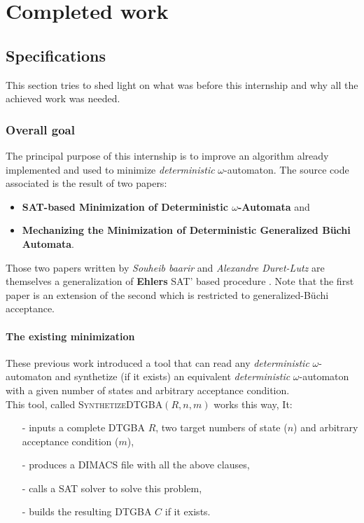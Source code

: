 \chapter{Completed work}

\section{Specifications}
This section tries to shed light on what was before this internship and why all the achieved work was
needed.

\subsection{Overall goal}
The principal purpose of this internship is to improve an algorithm already implemented and used to
minimize \textit{deterministic} $\omega$-automaton. The source code associated is the result of two papers:
\begin{itemize}
 \item \textbf{SAT-based Minimization of Deterministic $\omega$-Automata}\cite{15} and
 \item \textbf{Mechanizing the Minimization of Deterministic Generalized Büchi Automata}\cite{14}.
\end{itemize}

Those two papers written by \textit{Souheib baarir} and \textit{Alexandre Duret-Lutz} are themselves a
generalization of \textbf{Ehlers} SAT' based procedure \cite{17}. Note that the first paper\cite{15} is an
extension of the second\cite{14} which is restricted to generalized-Büchi acceptance.

\subsubsection{The existing minimization}
These previous work introduced a tool that can read any \textit{deterministic} $\omega$-automaton and
synthetize (if it exists) an equivalent \textit{deterministic} $\omega$-automaton with a given number
of states and arbitrary acceptance condition.\\

\noindent This tool, called \textsc{Synthetize}DTGBA$(R,n,m)$ works this way, It:
\begin{itemize}
 \item[-] inputs a complete DTGBA $R$, two target numbers of state ($n$) and arbitrary acceptance condition
          ($m$),
 \item[-] produces a DIMACS file \cite{18} with all the above clauses,
 \item[-] calls a SAT solver to solve this problem,
 \item[-] builds the resulting DTGBA $C$ if it exists.
\end{itemize}

